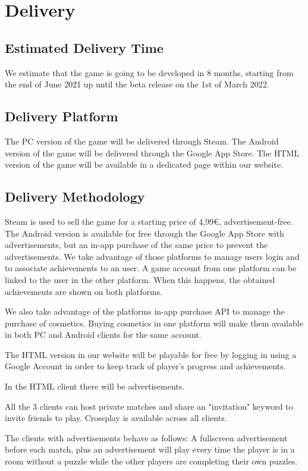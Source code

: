 \section{Delivery}
\subsection{Estimated Delivery Time}
We estimate that the game is going to be developed in 8 months, starting from the end of June 2021 up until the beta release on the 1st of March 2022.

\subsection{Delivery Platform}
The PC      version of the game will be delivered through Steam. 
The Android version of the game will be delivered through the Google App Store.
The HTML    version of the game will be available in a dedicated page within our website.

\subsection{Delivery Methodology}
Steam is used to sell the game for a starting price of 4,99€, advertisement-free.
The Android version is available for free through the Google App Store with advertisements, but an in-app purchase of the same price to prevent the advertisements.
We take advantage of those platforms to manage users login and to associate achievements to an user. A game account from one platform can be linked to the user in the other platform. When this happens, the obtained achievements are shown on both platforms. 


We also take advantage of the platforms in-app purchase API to manage the purchase of cosmetics. Buying cosmetics in one platform will make them available in both PC and Android clients for the same account.

The HTML version in our website will be playable for free by logging in using a Google Account in order to keep track of player's progress and achievements.

In the HTML client there will be advertisements.

All the 3 clients can host private matches and share an "invitation" keyword to invite friends to play. Crossplay is available across all clients.

The clients with advertisements behave as follows:
A fullscreen advertisement before each match, plus an advertisement will play every time the player is in a room without a puzzle while the other players are completing their own puzzles.

\pagebreak 